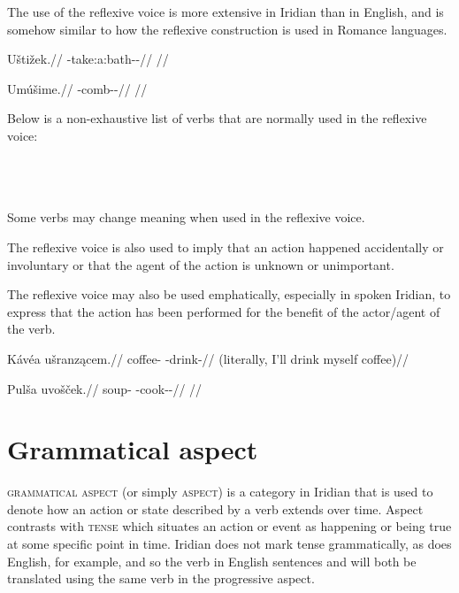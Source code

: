 The use of the reflexive voice is more extensive in Iridian than in
English, and is somehow similar to how the reflexive construction
is used in Romance languages.

\pex
\begingl
\gla Uštižek.//
\glb \Refl{}-take:a:bath-\Av{}-\Pf{}//
\glft {}//
\endgl
\xe

\pex
\begingl
\gla Umúšime.//
\glb \Refl{}-comb-\Av{}-\Prog{}//
\glft {}//
\endgl
\xe

Below is a non-exhaustive list of verbs that are normally used in the reflexive
voice:
\bigskip

\noindent
{} \\
 \\
 \\

Some verbs may change meaning when used in the reflexive voice.


The reflexive voice is also used to imply that an action happened accidentally
or involuntary or that the agent of the action is unknown or unimportant.

The reflexive voice may also be used emphatically, especially in spoken Iridian,
to express that the action has been performed for the benefit of the actor/agent
of the verb.

\pex
\begingl
\gla Kávéa ušranzącem.//
\glb coffee-\Acc{} \Refl{}-drink-//
\glft {} (literally, I'll drink myself coffee)//
\endgl
\xe

\pex
\begingl
\gla Pulša uvošček.//
\glb soup-\Acc{} \Refl{}-cook-\Av{}-\Pf{}//
\glft {}//
\endgl
\xe

\section{Grammatical aspect}\label{sec:aspect}

{\scshape grammatical aspect} (or simply {\scshape aspect}) is a category in
Iridian that is used to denote how an action or state described by a verb
extends over time. Aspect contrasts with {\scshape tense} which situates an
action or event as happening or being true at some specific point in time.
Iridian does not mark tense grammatically, as does English, for
example, and so the verb in English sentences  and  will both be
translated using the same verb in the progressive aspect. 

